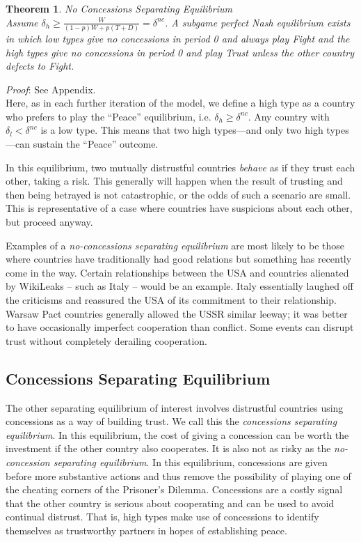 \documentclass[12pt, letterpaper]{article}
\newcommand{\de}{\delta}
\newtheorem{theorem}{Theorem}
\begin{document}
\begin{theorem}
\emph{No Concessions Separating Equilibrium}\\
	Assume $\delta_h \geq \frac{W}{(1-p)W + p(T+D)}=\de^{nc}$. A subgame perfect Nash equilibrium exists in which low types give no concessions in period 0 and always play Fight and the high types give no concessions in period 0 and play Trust unless the other country defects to Fight.
	\label{theorem:1}
\end{theorem}
\emph{Proof}: See Appendix.
\\
Here, as in each further iteration of the model, we define a high type as a country who prefers to play the ``Peace'' equilibrium, i.e. $\delta_h \geq \delta^{nc}$. Any country with $\delta_l < \delta^{nc}$ is a low type. This means that two high types---and only two high types---can sustain the ``Peace'' outcome.

In this equilibrium, two mutually distrustful countries \emph{behave} as if they trust each other, taking a risk. This generally will happen when the result of trusting and then being betrayed is not catastrophic, or the odds of such a scenario are small. This is representative of a case where countries have suspicions about each other, but proceed anyway. 

Examples of a \emph{no-concessions separating equilibrium} are most likely to be those where countries have traditionally had good relations but something has recently come in the way. Certain relationships between the USA and countries alienated by WikiLeaks -- such as Italy -- would be an example. Italy essentially laughed off the criticisms and reassured the USA of its commitment to their relationship. Warsaw Pact countries generally allowed the USSR similar leeway; it was better to have occasionally imperfect cooperation than conflict. Some events can disrupt trust without completely derailing cooperation. 

\subsection{Concessions Separating Equilibrium}
\label{sec:cse}
The other separating equilibrium of interest involves distrustful countries using concessions as a way of building trust. We call this the \emph{concessions separating equilibrium}. In this equilibrium, the cost of giving a concession can be worth the investment if the other country also cooperates. It is also not as risky as the \emph{no-concession separating equilibrium}. In this equilibrium, concessions are given before more substantive actions and thus remove the possibility of playing one of the cheating corners of the Prisoner's Dilemma. Concessions are a costly signal that the other country is serious about cooperating and can be used to avoid continual distrust. That is, high types make use of concessions to identify themselves as trustworthy partners in hopes of establishing peace.
\end{document}
